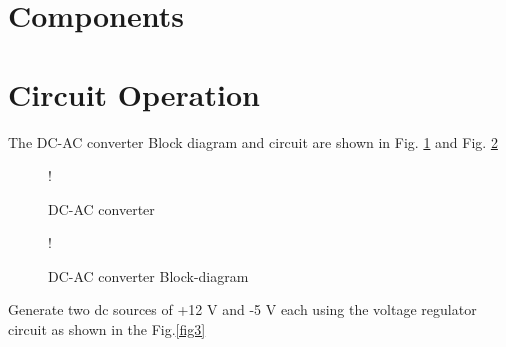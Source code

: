 \documentclass[journal,12pt,twocolumn]{IEEEtran}
\begin{document}
\section{Components}
\begin{table}[!h]
\centering

\caption{}
\label{table:components}
\end{table}
\section{Circuit Operation}
The DC-AC converter Block diagram and circuit are shown in Fig. \ref{fig1} and Fig. \ref{fig2}
\begin{figure}[!h]
\centering
\resizebox {\columnwidth} {!} {

}
\caption{DC-AC converter} 
\label{fig1}
\end{figure}
\begin{figure}[!h]
\centering
\resizebox {\columnwidth} {!} {

}
\caption{DC-AC converter Block-diagram} 
\label{fig2}
\end{figure}

\begin{problem}
Generate two dc sources of +12 V and -5 V each using the voltage regulator circuit as shown in the Fig.\ref{fig3}  
  \end{problem}
\end{document}
